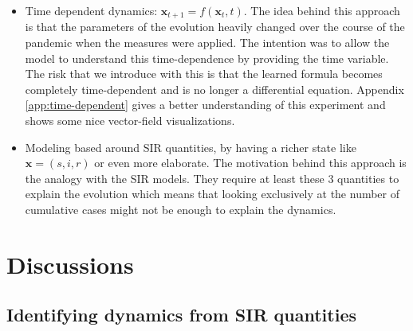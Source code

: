 \documentclass[12pt, letterpaper]{article}
\begin{document}
\begin{itemize} 
	\item Time dependent dynamics: $\mathbf{x}_{t+1} = f(\mathbf{x}_t, t)$. 
	The idea behind this approach is that the parameters of the evolution heavily changed over the course of the pandemic when the measures were applied. 
	The intention was to allow the model to understand this time-dependence by providing the time variable. 
	The risk that we introduce with this is that the learned formula becomes completely time-dependent and is no longer a differential equation.
	Appendix \ref{app:time-dependent} gives a better understanding of this experiment and shows some nice vector-field visualizations.

	\item Modeling based around SIR quantities, by having a richer state like $\mathbf{x} = (s, i, r)$ or even more elaborate. 
	The motivation behind this approach is the analogy with the SIR models.
	They require at least these 3 quantities to explain the evolution which means that looking exclusively at the number of cumulative cases might not be enough to explain the dynamics. 

\end{itemize}

\section{Discussions}

\subsection{Identifying dynamics from SIR quantities}
\end{document}

